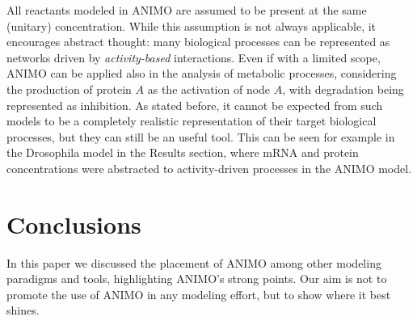 \documentclass{bmcart}
\begin{document}
All reactants modeled in ANIMO are assumed to be present at the same
(unitary) concentration. While this assumption is not always applicable, it encourages
abstract thought: many biological processes can be represented as networks driven by
\emph{activity-based} interactions. Even if with a limited scope, ANIMO can be applied
also in the analysis of metabolic processes, considering the production of protein $A$ as
the activation of node $A$, with degradation being represented as inhibition. As stated before,
it cannot be expected from such models to be a completely realistic representation of their target biological
processes, but they can still be an useful tool. This can be seen for example in the Drosophila
model in the Results section, where mRNA and protein concentrations were abstracted to
activity-driven processes in the ANIMO model.





\section*{Conclusions}
%
%

In this paper we discussed the placement of ANIMO among other modeling paradigms and tools, highlighting ANIMO's strong points. Our aim is not to promote the use of ANIMO in any modeling effort, but to show where it best shines.
\end{document}
